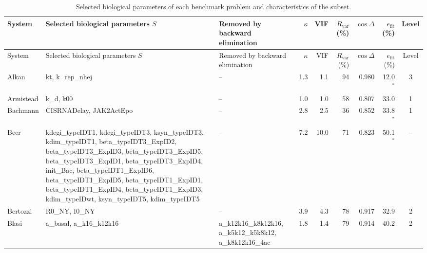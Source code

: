 \begin{longtable}{@{}>{\raggedright\arraybackslash}p{1.9cm}>{\raggedright\arraybackslash}p{3.9cm}>{\raggedright\arraybackslash}p{2.7cm}rrrrrc@{}}
\caption{Selected biological parameters of each benchmark problem and characteristics of the subset.}\label{tab:selected}\\
\toprule
System & Selected biological parameters $S$ & Removed by backward elimination & $\kappa$ & VIF & $R_{\mathrm{var}}$ (\%) & $\cos\Delta$ & $e_{\mathrm{fit}}$ (\%) & Level \\
\midrule
\endfirsthead
\toprule
System & Selected biological parameters $S$ & Removed by backward elimination & $\kappa$ & VIF & $R_{\mathrm{var}}$ (\%) & $\cos\Delta$ & $e_{\mathrm{fit}}$ (\%) & Level \\
\midrule
\endhead
Alkan & kt, \allowbreak{}k\_\allowbreak{}rep\_\allowbreak{}nhej & -- & 1.3 & 1.1 & 94 & 0.980 & 12.0$^{\ast}$ & 3 \\
Armistead & k\_\allowbreak{}d, \allowbreak{}k00 & -- & 1.0 & 1.0 & 58 & 0.807 & 33.0 & 1 \\
Bachmann & CISRNADelay, \allowbreak{}JAK2ActEpo & -- & 2.8 & 2.5 & 36 & 0.852 & 33.8$^{\ast}$ & 1 \\
Beer & kdegi\_\allowbreak{}typeIDT1, \allowbreak{}kdegi\_\allowbreak{}typeIDT3, \allowbreak{}ksyn\_\allowbreak{}typeIDT3, \allowbreak{}kdim\_\allowbreak{}typeIDT1, \allowbreak{}beta\_\allowbreak{}typeIDT3\_\allowbreak{}ExpID2, \allowbreak{}beta\_\allowbreak{}typeIDT3\_\allowbreak{}ExpID3, \allowbreak{}beta\_\allowbreak{}typeIDT3\_\allowbreak{}ExpID5, \allowbreak{}beta\_\allowbreak{}typeIDT3\_\allowbreak{}ExpID1, \allowbreak{}beta\_\allowbreak{}typeIDT3\_\allowbreak{}ExpID4, \allowbreak{}init\_\allowbreak{}Bac, \allowbreak{}beta\_\allowbreak{}typeIDT1\_\allowbreak{}ExpID6, \allowbreak{}beta\_\allowbreak{}typeIDT1\_\allowbreak{}ExpID5, \allowbreak{}beta\_\allowbreak{}typeIDT1\_\allowbreak{}ExpID1, \allowbreak{}beta\_\allowbreak{}typeIDT1\_\allowbreak{}ExpID4, \allowbreak{}beta\_\allowbreak{}typeIDT1\_\allowbreak{}ExpID3, \allowbreak{}kdim\_\allowbreak{}typeIDwt, \allowbreak{}ksyn\_\allowbreak{}typeIDT5, \allowbreak{}kdim\_\allowbreak{}typeIDT5 & -- & 7.2 & 10.0 & 71 & 0.823 & 50.1$^{\ast}$ & -- \\
Bertozzi & R0\_\allowbreak{}NY, \allowbreak{}I0\_\allowbreak{}NY & -- & 3.9 & 4.3 & 78 & 0.917 & 32.9 & 2 \\
Blasi & a\_\allowbreak{}basal, \allowbreak{}a\_\allowbreak{}k16\_\allowbreak{}k12k16 & a\_\allowbreak{}k12k16\_\allowbreak{}k8k12k16, \allowbreak{}a\_\allowbreak{}k5k12\_\allowbreak{}k5k8k12, \allowbreak{}a\_\allowbreak{}k8k12k16\_\allowbreak{}4ac & 1.8 & 1.4 & 79 & 0.914 & 40.2 & 2 \\

\end{longtable}
